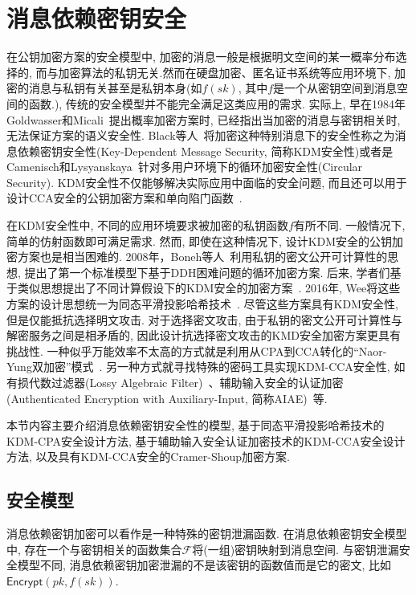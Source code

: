 \section{消息依赖密钥安全}

在公钥加密方案的安全模型中, 加密的消息一般是根据明文空间的某一概率分布选择的, 而与加密算法的私钥无关.然而在硬盘加密、匿名证书系统等应用环境下, 加密的消息与私钥有关甚至是私钥本身(如$f(sk)$, 其中$f$是一个从密钥空间到消息空间的函数.), 传统的安全模型并不能完全满足这类应用的需求. 实际上, 早在1984年Goldwasser和Micali~\cite{GM-JCSS-1984}提出概率加密方案时, 已经指出当加密的消息与密钥相关时, 无法保证方案的语义安全性. Black等人~\cite{BRS2002}将加密这种特别消息下的安全性称之为消息依赖密钥安全性(Key-Dependent Message Security, 简称KDM安全性)或者是Camenisch和Lysyanskaya~\cite{CL-EUROCRYPT-2001}针对多用户环境下的循环加密安全性(Circular Security). KDM安全性不仅能够解决实际应用中面临的安全问题, 而且还可以用于设计CCA安全的公钥加密方案和单向陷门函数~\cite{KMT-JOC-2022}.

在KDM安全性中, 不同的应用环境要求被加密的私钥函数$f$有所不同. 一般情况下, 简单的仿射函数即可满足需求. 然而, 即使在这种情况下, 设计KDM安全的公钥加密方案也是相当困难的. 2008年，Boneh等人~\cite{BHHO2008}利用私钥的密文公开可计算性的思想, 提出了第一个标准模型下基于DDH困难问题的循环加密方案. 后来, 学者们基于类似思想提出了不同计算假设下的KDM安全的加密方案~\cite{ACPS2009,BG2010,MTY2011-EUROCRYPT}. 2016年, Wee将这些方案的设计思想统一为同态平滑投影哈希技术~\cite{Wee-PKC-2016}. 尽管这些方案具有KDM安全性, 但是仅能抵抗选择明文攻击. 对于选择密文攻击, 由于私钥的密文公开可计算性与解密服务之间是相矛盾的, 因此设计抗选择密文攻击的KMD安全加密方案更具有挑战性. 一种似乎万能效率不太高的方式就是利用从CPA到CCA转化的``Naor-Yung双加密''模式~\cite{CCS2009}. 另一种方式就寻找特殊的密码工具实现KDM-CCA安全性, 如有损代数过滤器(Lossy Algebraic Filter)~\cite{Hofheinz2013-EUROCRYPT}、辅助输入安全的认证加密(Authenticated Encryption with Auxiliary-Input, 简称AIAE)~\cite{HLL-ASIACRYPT-2016}等. 

本节内容主要介绍消息依赖密钥安全性的模型, 基于同态平滑投影哈希技术的KDM-CPA安全设计方法, 基于辅助输入安全认证加密技术的KDM-CCA安全设计方法, 以及具有KDM-CCA安全的Cramer-Shoup加密方案.

\subsection{安全模型}
消息依赖密钥加密可以看作是一种特殊的密钥泄漏函数. 在消息依赖密钥安全模型中, 存在一个与密钥相关的函数集合$\mathcal{F}$将(一组)密钥映射到消息空间. 与密钥泄漏安全模型不同, 消息依赖密钥加密泄漏的不是该密钥的函数值而是它的密文, 比如$\mathsf{Encrypt}(pk,f(sk))$.

